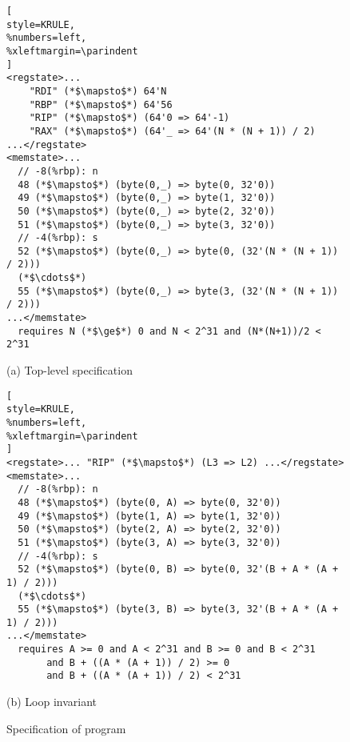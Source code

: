 

\setlength{\textfloatsep}{1\baselineskip plus 0.2\baselineskip minus 0.5\baselineskip}
\begin{figure}
\begin{lstlisting}[
style=KRULE,
%numbers=left,
%xleftmargin=\parindent
]
<regstate>... 
    "RDI" (*$\mapsto$*) 64'N
    "RBP" (*$\mapsto$*) 64'56
    "RIP" (*$\mapsto$*) (64'0 => 64'-1) 
    "RAX" (*$\mapsto$*) (64'_ => 64'(N * (N + 1)) / 2)
...</regstate>
<memstate>...
  // -8(%rbp): n
  48 (*$\mapsto$*) (byte(0,_) => byte(0, 32'0))
  49 (*$\mapsto$*) (byte(0,_) => byte(1, 32'0))
  50 (*$\mapsto$*) (byte(0,_) => byte(2, 32'0))
  51 (*$\mapsto$*) (byte(0,_) => byte(3, 32'0))
  // -4(%rbp): s
  52 (*$\mapsto$*) (byte(0,_) => byte(0, (32'(N * (N + 1)) / 2)))
  (*$\cdots$*)
  55 (*$\mapsto$*) (byte(0,_) => byte(3, (32'(N * (N + 1)) / 2)))
...</memstate>
  requires N (*$\ge$*) 0 and N < 2^31 and (N*(N+1))/2 < 2^31
\end{lstlisting}
\vspace{-5pt}
\begin{center}
{\small (a) Top-level specification}
\end{center}
\begin{lstlisting}[
style=KRULE,
%numbers=left,
%xleftmargin=\parindent
]
<regstate>... "RIP" (*$\mapsto$*) (L3 => L2) ...</regstate>
<memstate>...
  // -8(%rbp): n
  48 (*$\mapsto$*) (byte(0, A) => byte(0, 32'0))
  49 (*$\mapsto$*) (byte(1, A) => byte(1, 32'0))
  50 (*$\mapsto$*) (byte(2, A) => byte(2, 32'0))
  51 (*$\mapsto$*) (byte(3, A) => byte(3, 32'0))
  // -4(%rbp): s
  52 (*$\mapsto$*) (byte(0, B) => byte(0, 32'(B + A * (A + 1) / 2)))
  (*$\cdots$*)
  55 (*$\mapsto$*) (byte(3, B) => byte(3, 32'(B + A * (A + 1) / 2)))
...</memstate>
  requires A >= 0 and A < 2^31 and B >= 0 and B < 2^31
       and B + ((A * (A + 1)) / 2) >= 0  
       and B + ((A * (A + 1)) / 2) < 2^31
\end{lstlisting}
\vspace{-5pt}
\begin{center}
{\small (b) Loop invariant}
\end{center}
\vspace{-5pt}
\caption{Specification of  program}
\label{fig:sum-to-n-spec}
\end{figure}

